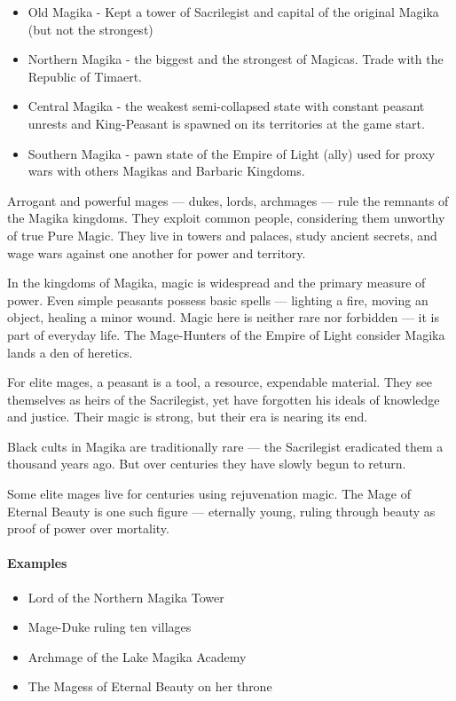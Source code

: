 \begin{itemize}
    \item Old Magika - Kept a tower of Sacrilegist and capital of the original Magika (but not the strongest)
    \item Northern Magika - the biggest and the strongest of Magicas. Trade with the Republic of Timaert. 
    \item Central Magika - the weakest semi-collapsed state with constant peasant unrests and King-Peasant is spawned on its territories at the game start.
    \item Southern Magika - pawn state of the Empire of Light (ally) used for proxy wars with others Magikas and Barbaric Kingdoms.
\end{itemize}

Arrogant and powerful mages — dukes, lords, archmages — rule the remnants of the Magika kingdoms. They exploit common people, considering them unworthy of true Pure Magic. They live in towers and palaces, study ancient secrets, and wage wars against one another for power and territory.

In the kingdoms of Magika, magic is widespread and the primary measure of power. Even simple peasants possess basic spells — lighting a fire, moving an object, healing a minor wound. Magic here is neither rare nor forbidden — it is part of everyday life. The Mage-Hunters of the Empire of Light consider Magika lands a den of heretics.

For elite mages, a peasant is a tool, a resource, expendable material. They see themselves as heirs of the Sacrilegist, yet have forgotten his ideals of knowledge and justice. Their magic is strong, but their era is nearing its end.

Black cults in Magika are traditionally rare — the Sacrilegist eradicated them a thousand years ago. But over centuries they have slowly begun to return.

Some elite mages live for centuries using rejuvenation magic. The Mage of Eternal Beauty is one such figure — eternally young, ruling through beauty as proof of power over mortality.

\paragraph{Examples}
\begin{itemize}
\item Lord of the Northern Magika Tower
\item Mage-Duke ruling ten villages
\item Archmage of the Lake Magika Academy
\item The Magess of Eternal Beauty on her throne
\end{itemize}



